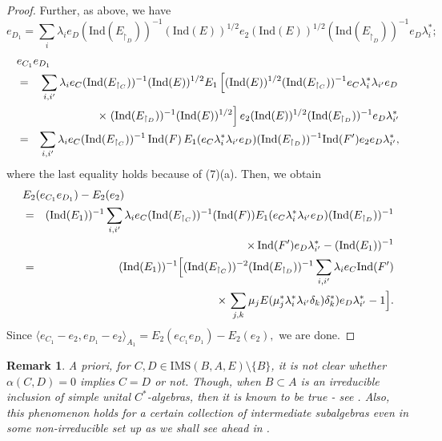 \documentclass[a4]{amsart}
\newtheorem{remark}[theorem]{\bf Remark}
\numberwithin{equation}{section}
\begin{document}
\begin{proof}
Further, as above, we
        have
        \[
e_{D_1}= \sum_{i}
        \lambda_{i} e_D (\mathrm{Ind}(E_{\restriction_{D}}))^{-1}
        (\mathrm{Ind}(E))^{1/2} e_2
        (\mathrm{Ind}(E))^{1/2}(\mathrm{Ind}(E_{\restriction_{D}}))^{-1}
        e_D \lambda_{i}^*;
        \]         
\begin{eqnarray*}
\lefteqn{ e_{C_1}e_{D_1}}\\ & = & \sum_{i,i'}\lambda_{i} e_C
(\mathrm{Ind}(E_{\restriction_{C}}))^{-1}(\mathrm{Ind}(E))^{1/2}
E_{1}\left[(\mathrm{Ind}(E))^{1/2}(\mathrm{Ind}(E_{\restriction_{C}}))^{-1}e_C
\lambda_{i}^* \lambda_{i'} e_D
\right.\\ & & \qquad \times
\left. (\mathrm{Ind}(E_{\restriction_{D}}))^{-1}(\mathrm{Ind}(E))^{1/2}\right] e_2
(\mathrm{Ind}(E))^{1/2}(\mathrm{Ind}(E_{\restriction_{D}}))^{-1} e_D
\lambda_{i'}^* \\ & = & \sum_{i,i'} \lambda_{i} e_C
(\mathrm{Ind}(E_{\restriction_{C}}))^{-1}\, \mathrm{Ind}(F)\, E_{1}(e_C
\lambda_{i}^*
\lambda_{i'}e_D)(\mathrm{Ind}(E_{\restriction_{D}}))^{-1}
\mathrm{Ind}(F') e_2 e_D \lambda_{i'}^*,
\end{eqnarray*}
where the last equality holds because of   (7)(a). Then, we obtain
\begin{eqnarray*}
\lefteqn{E_{2}(e_{C_1} e_{D_1}) - E_{2}(e_2)}\\ & = &
(\mathrm{Ind}(E_1))^{-1}\sum_{i,i'} \lambda_{i} e_C
(\mathrm{Ind}(E_{\restriction_{C}}))^{-1} (\mathrm{Ind}(F)) E_{1}(e_C
\lambda_{i}^*
\lambda_{i'}e_D)(\mathrm{Ind}(E_{\restriction_{D}}))^{-1}\\
 & &\quad \times\, \mathrm{Ind}(F') e_D \lambda_{i'}^* -(\mathrm{Ind}(E_1))^{-1}  \\
& =& (\mathrm{Ind}(E_{1}))^{-1}
\Big[(\mathrm{Ind}(E_{\restriction_{C}}))^{-2}
  (\mathrm{Ind}(E_{\restriction_{D}}))^{-1} \sum_{i,i'} \lambda_i e_C
  \mathrm{Ind}(F')\\ & & \quad \times\, \sum_{j,k} \mu_{j} E(\mu_{j}^* \lambda_{i}^*
  \lambda_{i'} \delta_{k}) \delta_{k}^*) e_D \lambda_{i'}^* - 1
  \Big].
\end{eqnarray*}
Since
\(
\langle e_{C_{1}} - e_2 , e_{D_{1}}- e_2 \rangle_{A_{1}} = 
E_{2}(e_{C_1} e_{D_1}) - E_{2}(e_2),
\)
we are done.\end{proof}


\begin{remark}
A priori, for $C, D \in \mathrm{IMS} (B,A,E)\setminus
      \{B\}$, it is not clear whether $\alpha(C,D)=0$ implies $C=D$ or
      not. Though, when $B \subset A$ is an irreducible inclusion of
      simple unital $C^*$-algebras, then it is known to be true - see
      \cite[Proposition 5.10]{BG2}. Also, this phenomenon holds for a
      certain collection of intermediate subalgebras even in some
      non-irreducible set up as we shall see ahead in .
\end{remark}
\end{document}
